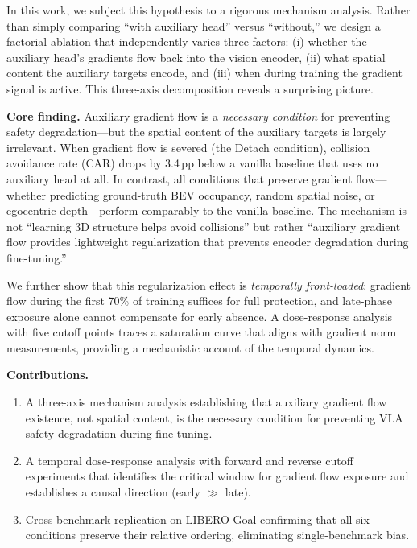 \documentclass[10pt,twocolumn]{article}
\begin{document}
In this work, we subject this hypothesis to a rigorous mechanism analysis.
Rather than simply comparing ``with auxiliary head'' versus ``without,'' we design a factorial ablation that independently varies three factors:
(i) whether the auxiliary head's gradients flow back into the vision encoder,
(ii) what spatial content the auxiliary targets encode, and
(iii) when during training the gradient signal is active.
This three-axis decomposition reveals a surprising picture.

\textbf{Core finding.}\quad
Auxiliary gradient flow is a \emph{necessary condition} for preventing safety degradation---but the spatial content of the auxiliary targets is largely irrelevant.
When gradient flow is severed (the Detach condition), collision avoidance rate (CAR) drops by 3.4\,pp below a vanilla baseline that uses no auxiliary head at all.
In contrast, all conditions that preserve gradient flow---whether predicting ground-truth BEV occupancy, random spatial noise, or egocentric depth---perform comparably to the vanilla baseline.
The mechanism is not ``learning 3D structure helps avoid collisions'' but rather ``auxiliary gradient flow provides lightweight regularization that prevents encoder degradation during fine-tuning.''

We further show that this regularization effect is \emph{temporally front-loaded}: gradient flow during the first 70\% of training suffices for full protection, and late-phase exposure alone cannot compensate for early absence.
A dose-response analysis with five cutoff points traces a saturation curve that aligns with gradient norm measurements, providing a mechanistic account of the temporal dynamics.

\textbf{Contributions.}
\begin{enumerate}
\item A three-axis mechanism analysis establishing that auxiliary gradient flow existence, not spatial content, is the necessary condition for preventing VLA safety degradation during fine-tuning.
\item A temporal dose-response analysis with forward and reverse cutoff experiments that identifies the critical window for gradient flow exposure and establishes a causal direction (early $\gg$ late).
\item Cross-benchmark replication on LIBERO-Goal confirming that all six conditions preserve their relative ordering, eliminating single-benchmark bias.
\end{enumerate}
\end{document}
